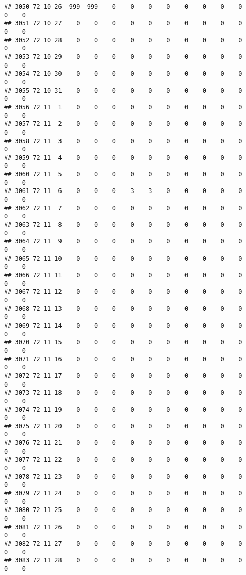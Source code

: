 \documentclass[]{article}
\begin{document}
\begin{verbatim}
## 3050 72 10 26 -999 -999    0    0    0    0    0    0    0    0    0    0
## 3051 72 10 27    0    0    0    0    0    0    0    0    0    0    0    0
## 3052 72 10 28    0    0    0    0    0    0    0    0    0    0    0    0
## 3053 72 10 29    0    0    0    0    0    0    0    0    0    0    0    0
## 3054 72 10 30    0    0    0    0    0    0    0    0    0    0    0    0
## 3055 72 10 31    0    0    0    0    0    0    0    0    0    0    0    0
## 3056 72 11  1    0    0    0    0    0    0    0    0    0    0    0    0
## 3057 72 11  2    0    0    0    0    0    0    0    0    0    0    0    0
## 3058 72 11  3    0    0    0    0    0    0    0    0    0    0    0    0
## 3059 72 11  4    0    0    0    0    0    0    0    0    0    0    0    0
## 3060 72 11  5    0    0    0    0    0    0    0    0    0    0    0    0
## 3061 72 11  6    0    0    0    3    3    0    0    0    0    0    0    0
## 3062 72 11  7    0    0    0    0    0    0    0    0    0    0    0    0
## 3063 72 11  8    0    0    0    0    0    0    0    0    0    0    0    0
## 3064 72 11  9    0    0    0    0    0    0    0    0    0    0    0    0
## 3065 72 11 10    0    0    0    0    0    0    0    0    0    0    0    0
## 3066 72 11 11    0    0    0    0    0    0    0    0    0    0    0    0
## 3067 72 11 12    0    0    0    0    0    0    0    0    0    0    0    0
## 3068 72 11 13    0    0    0    0    0    0    0    0    0    0    0    0
## 3069 72 11 14    0    0    0    0    0    0    0    0    0    0    0    0
## 3070 72 11 15    0    0    0    0    0    0    0    0    0    0    0    0
## 3071 72 11 16    0    0    0    0    0    0    0    0    0    0    0    0
## 3072 72 11 17    0    0    0    0    0    0    0    0    0    0    0    0
## 3073 72 11 18    0    0    0    0    0    0    0    0    0    0    0    0
## 3074 72 11 19    0    0    0    0    0    0    0    0    0    0    0    0
## 3075 72 11 20    0    0    0    0    0    0    0    0    0    0    0    0
## 3076 72 11 21    0    0    0    0    0    0    0    0    0    0    0    0
## 3077 72 11 22    0    0    0    0    0    0    0    0    0    0    0    0
## 3078 72 11 23    0    0    0    0    0    0    0    0    0    0    0    0
## 3079 72 11 24    0    0    0    0    0    0    0    0    0    0    0    0
## 3080 72 11 25    0    0    0    0    0    0    0    0    0    0    0    0
## 3081 72 11 26    0    0    0    0    0    0    0    0    0    0    0    0
## 3082 72 11 27    0    0    0    0    0    0    0    0    0    0    0    0
## 3083 72 11 28    0    0    0    0    0    0    0    0    0    0    0    0

\end{verbatim}
\end{document}
